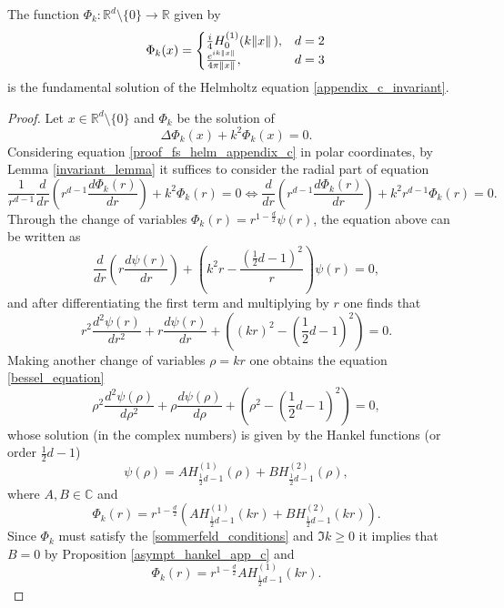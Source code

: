 \begin{proposition}
    The function \(\Phi_k: \mathbb{R}^d \setminus \{0\} \rightarrow \mathbb{R}\) given by
    \[
    \Phi_k(x) = \begin{cases}
        \frac{i}{4} H_0^{(1)}(k \norm*{x}), & d=2\\
        \frac{e^{i k \norm*{x}}}{4 \pi \norm*{x}}, & d = 3
    \end{cases}    
    \]
    is the fundamental solution of the Helmholtz equation \eqref{appendix_c_invariant}.
\end{proposition}
\begin{proof}
    Let \(x \in \mathbb{R}^d \setminus \{0\}\) and \(\Phi_k\) be the solution of
    \begin{equation}\label{proof_fs_helm_appendix_c}
        \Delta \Phi_k(x) + k^2 \Phi_k(x) = 0.
    \end{equation}
    Considering equation \eqref{proof_fs_helm_appendix_c} in polar coordinates, by Lemma \ref{invariant_lemma} it suffices to consider the radial part of equation
    \[
        \frac{1}{r^{d-1}} \frac{d}{d r}\left(r^{d-1}\frac{d \Phi_k(r)}{d r}\right) + k^2\Phi_k(r) = 0 \iff \frac{d}{d r}\left(r^{d-1}\frac{d \Phi_k(r)}{d r}\right) + k^2 r^{d-1}\Phi_k(r) = 0.
    \]
    Through the change of variables \(\Phi_k(r) = r^{1-\frac{d}{2}}\psi(r)\), the equation above can be written as
    \[
        \frac{d}{d r}\left(r \frac{d \psi(r)}{d r}\right) + \left(k^2 r - \frac{\left(\frac{1}{2}d-1\right)^2}{r}\right)\psi(r) = 0,
    \]
    and after differentiating the first term and multiplying by \(r\) one finds that 
    \[
        r^2\frac{d^2 \psi(r)}{d r^2} + r\frac{d \psi(r)}{d r} + \left(\left(kr\right)^2-\left(\frac{1}{2}d-1\right)^2\right) = 0.
    \]
    Making another change of variables \(\rho = k r\) one obtains the equation \eqref{bessel_equation}
    \[
        \rho^2\frac{d^2 \psi(\rho)}{d \rho^2} + \rho\frac{d \psi(\rho)}{d \rho} + \left(\rho^2-\left(\frac{1}{2}d-1\right)^2\right) = 0,
    \] 
    whose solution (in the complex numbers) is given by the Hankel functions (or order \(\frac{1}{2}d-1\))
    \[
        \psi(\rho) = A H^{(1)}_{\frac{1}{2}d-1}(\rho) + B H^{(2)}_{\frac{1}{2}d-1}(\rho),
    \]
    where \(A, B \in \mathbb{C}\) and 
    \[
        \Phi_k(r) = r^{1-\frac{d}{2}} \left(A H^{(1)}_{\frac{1}{2}d-1}(kr) + B H^{(2)}_{\frac{1}{2}d-1}(kr)\right).
    \]
    Since \(\Phi_k\) must satisfy the \ref{sommerfeld_conditions} and \(\Im{k} \geq 0\) it implies that \(B=0\) by Proposition \ref{asympt_hankel_app_c} and
    \[
        \Phi_k(r) = r^{1-\frac{d}{2}} A H^{(1)}_{\frac{1}{2}d-1}(kr).
\]
\end{proof}
